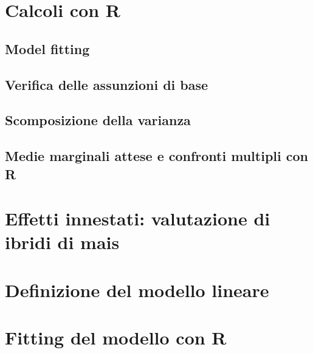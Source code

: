 \documentclass[a4paper,12pt,oneside]{book}
\begin{document}
\hypertarget{calcoli-con-r}{%
\section{Calcoli con R}\label{calcoli-con-r}}

\hypertarget{model-fitting}{%
\subsection{Model fitting}\label{model-fitting}}

\hypertarget{verifica-delle-assunzioni-di-base}{%
\subsection{Verifica delle assunzioni di base}\label{verifica-delle-assunzioni-di-base}}

\hypertarget{scomposizione-della-varianza-3}{%
\subsection{Scomposizione della varianza}\label{scomposizione-della-varianza-3}}

\hypertarget{medie-marginali-attese-e-confronti-multipli-con-r}{%
\subsection{Medie marginali attese e confronti multipli con R}\label{medie-marginali-attese-e-confronti-multipli-con-r}}

\hypertarget{effetti-innestati-valutazione-di-ibridi-di-mais}{%
\section{Effetti innestati: valutazione di ibridi di mais}\label{effetti-innestati-valutazione-di-ibridi-di-mais}}

\hypertarget{definizione-del-modello-lineare-2}{%
\section{Definizione del modello lineare}\label{definizione-del-modello-lineare-2}}

\hypertarget{fitting-del-modello-con-r-1}{%
\section{Fitting del modello con R}\label{fitting-del-modello-con-r-1}}
\end{document}
